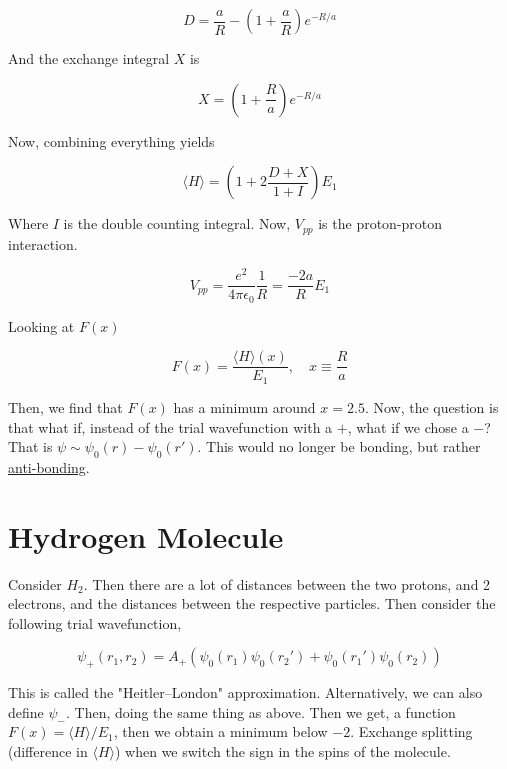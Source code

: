 \documentclass{article}
\newtheorem{one minute paper}[theorem]{One Minute Paper}
\begin{document}
\begin{equation}
    D = \frac{a}{R} - \left(  1 + \frac{a}{R} \right)e^{-R/a}
\end{equation}

And the exchange integral $X$ is 

\begin{equation}
    X = \left( 1 + \frac{R}{a} \right)e^{-R/a}
\end{equation}

Now, combining everything yields 

\begin{equation}
    \langle H \rangle = \left( 1 + 2\frac{D + X}{1 + I} \right)E_1
\end{equation}

Where $I$ is the double counting integral. Now, $V_{pp}$ is the proton-proton interaction. 

\begin{equation}
    V_{pp} = \frac{e^2}{4\pi \epsilon_0}\frac{1}{R} = \frac{-2a}{R}E_1
\end{equation}

Looking at $F(x)$ 

\begin{equation}
    F(x) = \frac{\langle H \rangle(x)}{E_1}, \quad x \equiv \frac{R}{a}
\end{equation}

Then, we find that $F(x)$ has a minimum around $x = 2.5$. Now, the question is that what if, instead of the trial wavefunction with a $+$, what if we chose a $-$? That is $\psi \sim \psi_0(r) - \psi_0(r')$. 
This would no longer be bonding, but rather \underline{anti-bonding}.

\section*{Hydrogen Molecule}

Consider $H_2$. Then there are a lot of distances between the two protons, and 2 electrons, and the distances between the respective particles. Then consider the following trial wavefunction,

\begin{equation}
    \psi_{+}(r_1, r_2) = A_{+}\left( \psi_0(r_1)\psi_0(r_2') + \psi_0(r_1')\psi_0(r_2) \right)
\end{equation}

This is called the "Heitler--London" approximation. Alternatively, we can also define $\psi_{-}$. Then, doing the same thing as above. Then we get, a function $F(x) = \langle H \rangle/E_1$, then we obtain a minimum below $-2$. Exchange splitting (difference in $\langle H \rangle$) when we switch the sign in the spins of the molecule. 
\end{document}
